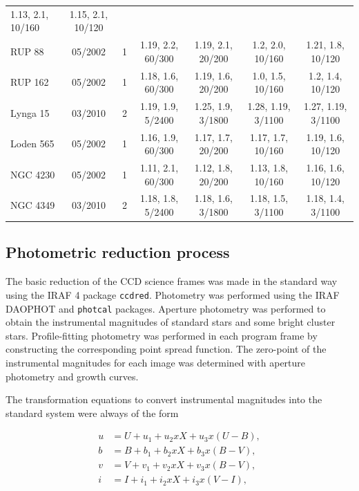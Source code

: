 \documentclass[draft]{aa}
\begin{document}
\begin{table}[ht]
\begin{tabular}{lcccccc}
        1.13, 2.1, 10/160 & 1.15, 2.1, 10/120\\
        RUP 88    & 05/2002 & 1 & 1.19, 2.2, 60/300 & 1.19, 2.1, 20/200 &
        1.2, 2.0, 10/160 & 1.21, 1.8, 10/120\\
        RUP 162   & 05/2002 & 1 & 1.18, 1.6, 60/300 & 1.19, 1.6, 20/200 &
        1.0, 1.5, 10/160 & 1.2, 1.4, 10/120\\
        Lynga 15  & 03/2010 & 2 & 1.19, 1.9, 5/2400 & 1.25, 1.9, 3/1800 &
        1.28, 1.19, 3/1100 & 1.27, 1.19, 3/1100\\
        Loden 565 & 05/2002 & 1 & 1.16, 1.9, 60/300 & 1.17, 1.7, 20/200 &
        1.17, 1.7, 10/160 & 1.19, 1.6, 10/120\\
        NGC 4230  & 05/2002 & 1 & 1.11, 2.1, 60/300 & 1.12, 1.8, 20/200 &
        1.13, 1.8, 10/160 & 1.16, 1.6, 10/120\\
        NGC 4349  & 03/2010 & 2 & 1.18, 1.8, 5/2400 & 1.18, 1.6, 3/1800 &
        1.18, 1.5, 3/1100 & 1.18, 1.4, 3/1100\\
        \hline
    \end{tabular}
    \label{tab:log_yalo}
\end{table}




\subsection{Photometric reduction process}
\label{ssec:photom_reduc}

The basic reduction of the CCD science frames was made in the standard way
using the IRAF 4 package \texttt{ccdred}. Photometry was performed using
the IRAF DAOPHOT \citep{Stetson_1987,Stetson_1990} and \texttt{photcal} packages.
Aperture photometry was performed to obtain the instrumental magnitudes of
standard stars and some bright cluster stars. Profile-fitting photometry was
performed in each program frame by constructing the corresponding point spread
function. The zero-point of the instrumental magnitudes for each image was
determined with aperture photometry and growth curves.

The transformation equations to convert instrumental magnitudes into the
standard system were always of the form

\begin{equation}
\begin{aligned}
  u  &=  U+u_1+u_2xX+u_3x(U-B), \\
  b  &=  B+b_1+b_2xX+b_3x(B-V), \\
  v  &=  V+v_1+v_2xX+v_3x(B-V), \\
  i  &=  I+i_1+i_2xX+i_3x(V-I),
\end{aligned}
\end{equation}
\end{document}

